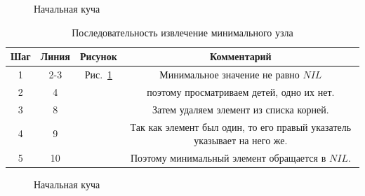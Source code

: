 \documentclass[a4paper,10pt]{article}
\begin{document}
            \begin{figure}[h!]
                \caption{Начальная куча}
                \label{fig:extract_one_step_1}
                \center
            \end{figure} 
            \begin{table}[h!]
                \caption{Последовательность извлечение минимального узла}
    			\center
                \begin{tabular}{|c|c|c|c|}
                    \hline
                    Шаг  & Линия &  Рисунок                           & Комментарий                \\ \hline
                      1  & 2-3   &  Рис.~\ref{fig:extract_one_step_1} & Минимальное значение не равно $NIL$ \\ 
                      2  & 4     &                                 & поэтому просматриваем детей, одно их нет. \\
                      3  & 8     &                                 & Затем удаляем элемент из списка корней. \\ 
                      4  & 9     &                                 & Так как элемент был один, то его правый указатель указывает на него же. \\
                      5  & 10    &                                 & Поэтому минимальный элемент обращается в $NIL$. \\ \hline
                \end{tabular}
            \end{table}


            \begin{figure}[h!]
                \caption{Начальная куча}
                \label{fig:extract_step_1}
                \center
            \end{figure} 
\end{document}
